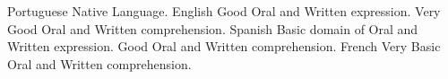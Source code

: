 \begin{cvhonors}
  \cvhonor
    {Portuguese}
    {Native Language.}
    {}
    {}
  \cvhonor
    {English}
    {Good Oral and Written expression. Very Good Oral and Written comprehension.}
    {}
    {}
  \cvhonor
    {Spanish }
    {Basic domain of Oral and Written expression. Good Oral and Written comprehension.}
    {}
    {}
  \cvhonor
    {French}
    {Very Basic Oral and Written comprehension.}
    {}
    {}
\end{cvhonors}

